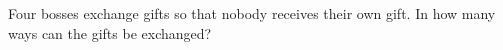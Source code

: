Four bosses exchange gifts so that nobody receives their own gift. In how many ways can the gifts be exchanged?
